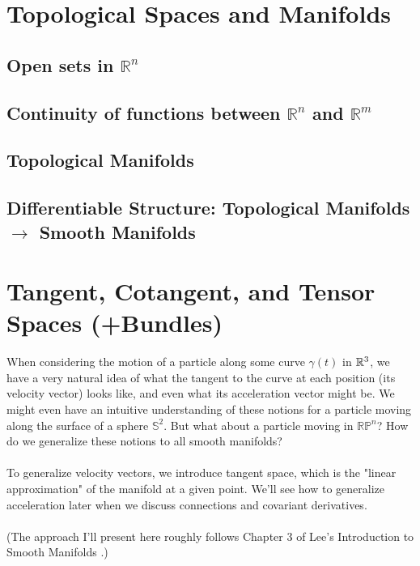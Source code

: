 \documentclass[11pt]{article}
\begin{document}
\newpage
\section{Topological Spaces and Manifolds}

\vskip 1cm
\subsection{Open sets in $\mathbb{R}^n$}

\vskip 1cm
\subsection{Continuity of functions between $\mathbb{R}^n$ and $\mathbb{R}^m$}


\vskip 1cm
\subsection{Topological Manifolds}


\vskip 1cm
\subsection{Differentiable Structure: Topological Manifolds $\rightarrow$ Smooth Manifolds}


\newpage
\section{Tangent, Cotangent, and Tensor Spaces (+Bundles)}
When considering the motion of a particle along some curve $\gamma(t)$ in $\mathbb{R}^3$, we have a very natural idea of what the tangent to the curve at each position (its velocity vector) looks like, and even what its acceleration vector might be. We might even have an intuitive understanding of these notions for a particle moving along the surface of a sphere $\mathbb{S}^2$. But what about a particle moving in $\mathbb{RP}^n$? How do we generalize these notions to all smooth manifolds? 
\\
\\
To generalize velocity vectors, we introduce tangent space, which is the "linear approximation" of the manifold at a given point. We'll see how to generalize acceleration later when we discuss connections and covariant derivatives.
\\
\\
(The approach I'll present here roughly follows Chapter 3 of Lee's Introduction to Smooth Manifolds \cite{LeeSM}.)
\\
\end{document}
